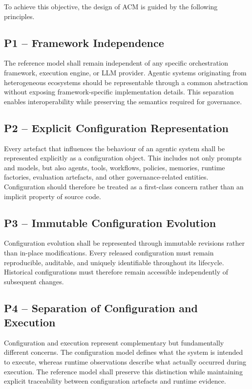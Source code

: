 \documentclass[10pt]{article}
\begin{document}
To achieve this objective, the design of ACM is guided by the following principles.

\subsection{P1 -- Framework Independence}

The reference model shall remain independent of any specific orchestration framework, execution engine, or LLM provider. Agentic systems originating from heterogeneous ecosystems should be representable through a common abstraction without exposing framework-specific implementation details. This separation enables interoperability while preserving the semantics required for governance.

\subsection{P2 -- Explicit Configuration Representation}

Every artefact that influences the behaviour of an agentic system shall be represented explicitly as a configuration object. This includes not only prompts and models, but also agents, tools, workflows, policies, memories, runtime factories, evaluation artefacts, and other governance-related entities. Configuration should therefore be treated as a first-class concern rather than an implicit property of source code.

\subsection{P3 -- Immutable Configuration Evolution}

Configuration evolution shall be represented through immutable revisions rather than in-place modifications. Every released configuration must remain reproducible, auditable, and uniquely identifiable throughout its lifecycle. Historical configurations must therefore remain accessible independently of subsequent changes.

\subsection{P4 -- Separation of Configuration and Execution}

Configuration and execution represent complementary but fundamentally different concerns. The configuration model defines what the system is intended to execute, whereas runtime observations describe what actually occurred during execution. The reference model shall preserve this distinction while maintaining explicit traceability between configuration artefacts and runtime evidence.
\end{document}
